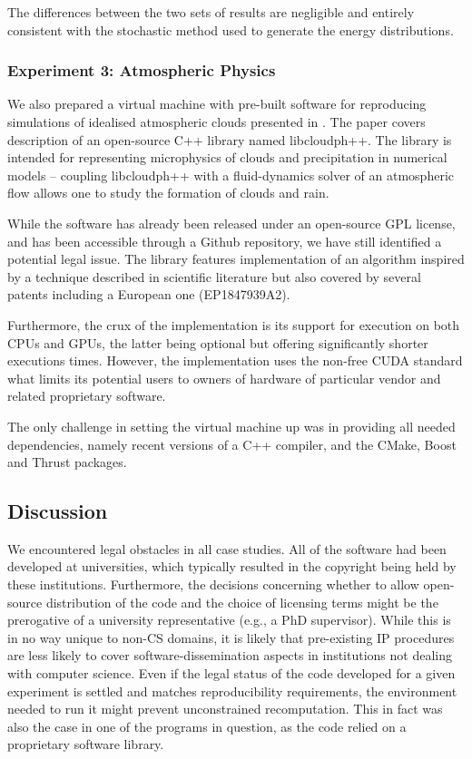 The differences between the two sets of results are negligible and entirely consistent with the stochastic method used to generate the energy distributions.

\subsubsection*{Experiment 3: Atmospheric Physics}

We also prepared a virtual machine with pre-built software for reproducing 
  simulations of idealised atmospheric clouds presented in \cite{arabas2013libcloud}.
The paper covers description of an open-source C++ library named libcloudph++. 
The library is intended for representing microphysics of clouds and precipitation
  in numerical models -- coupling libcloudph++ with a fluid-dynamics solver 
  of an atmospheric flow allows one to study the formation of clouds and rain.

While the software has already been released under an open-source GPL license,
  and has been accessible through a Github repository, we have still 
  identified a potential legal issue.
The library features implementation of an algorithm inspired by a technique 
  described in scientific literature but also covered by several patents 
  including a European one (EP1847939A2). 

Furthermore, the crux of the implementation is its support for execution
  on both CPUs and GPUs, the latter being optional but offering 
  significantly shorter executions times.
However, the implementation uses the non-free CUDA standard what limits its potential
  users to owners of hardware of particular vendor and related proprietary software.

The only challenge in setting the virtual machine up was in providing all needed
  dependencies, namely recent versions of a C++ compiler, and the CMake, Boost and Thrust 
  packages.

\subsection{Discussion}

We encountered legal obstacles in all case studies.
All of the software had been developed at universities, which typically resulted in the copyright being held by these institutions.
Furthermore, the decisions concerning whether to allow open-source distribution of the code and the choice of licensing terms might be the prerogative of a university representative (e.g., a PhD supervisor).
While this is in no way unique to non-CS domains, it is likely that pre-existing IP procedures are less likely to cover software-dissemination aspects in institutions not dealing with computer science.
Even if the legal status of the code developed for a given experiment is settled and matches reproducibility requirements, the environment needed to run it might prevent unconstrained recomputation.
This in fact was also the case in one of the programs in question, as the code relied on a proprietary software library.

